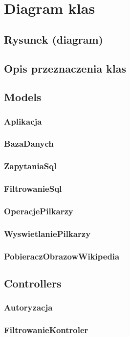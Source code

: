 \section{Diagram klas}
\subsection{Rysunek (diagram)}
\subsection{Opis przeznaczenia klas}


\subsection{Models}
    \subsubsection{Aplikacja}
    \subsubsection{BazaDanych}
    \subsubsection{ZapytaniaSql}
    \subsubsection{FiltrowanieSql}
    \subsubsection{OperacjePilkarzy}
    \subsubsection{WyswietlaniePilkarzy}
    \subsubsection{PobieraczObrazowWikipedia}

    \subsection{Controllers}
        \subsubsection{Autoryzacja}
        \subsubsection{FiltrowanieKontroler}
